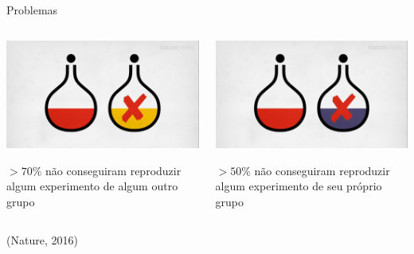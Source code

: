 \documentclass{beamer}
\begin{document}
\begin{frame}{Problemas}
  \begin{center}
    \begin{columns}
      \begin{column}{5cm}
        \includegraphics[width=\textwidth]{Intro/reprod-nature1}

        $>70\%$ não conseguiram reproduzir algum experimento de algum outro grupo
      \end{column}
      \begin{column}{5cm}
        \includegraphics[width=\textwidth]{Intro/reprod-nature2}

        $>50\%$ não conseguiram reproduzir algum experimento de seu próprio grupo
      \end{column}
    \end{columns}
  \end{center}

  \vfill
  \begin{center}
    (Nature, 2016)
  \end{center}
\end{frame}
\end{document}
